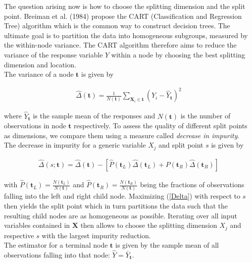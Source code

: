 {The question arising now is how to choose the splitting dimension and the split point. Breiman et al. (1984) propose the CART (Classification and Regression Tree) algorithm which is the common way to construct decision trees. The ultimate goal is to partition the data into homogeneous subgroups, measured by the within-node variance. The CART algorithm therefore aims to reduce the variance of the response variable $Y$ within a node by choosing the best splitting dimension and location. \\
The variance of a node $\mathbf{t}$ is given by

\begin{align}
    \hat{\Delta}(\mathbf{t}) = \frac{1}{N(\mathbf{t})} \sum_{\mathbf{X}_i \in \mathbf{t}} (Y_i - \hat{Y}_\mathbf{t})^2 \label{node_variance}
\end{align}

where $\hat{Y}_\mathbf{t}$ is the sample mean of the responses and $N(\mathbf{t})$ is the number of observations in node $\mathbf{t}$ respectively. To assess the quality of different split points as dimensions, we compare them using a measure called \textit{decrease in impurity}. The decrease in impurity for a generic variable $X_j$ and split point $s$ is given by

\begin{align}
    \hat{\Delta}(s; \mathbf{t}) = \hat{\Delta}(\mathbf{t}) - [\hat{P}(\mathbf{t}_L) \hat{\Delta}(\mathbf{t}_L) + \hat{P}(\mathbf{t}_R) \hat{\Delta}(\mathbf{t}_R)] \label{Delta}
\end{align}

with $\hat{P}(\mathbf{t}_L) = \frac{N(\mathbf{t}_L)}{N(\mathbf{t})}$ and $\hat{P}(\mathbf{t}_R) = \frac{N(\mathbf{t}_R)}{N(\mathbf{t})}$ being the fractions of observations falling into the left and right child node. Maximizing (\ref{Delta}) with respect to $s$ then yields the split point which in turn partitions the data such that the resulting child nodes are as homogeneous as possible. Iterating over all input variables contained in $\mathbf{X}$ then allows to choose the splitting dimension $X_j$ and respective $s$ with the largest impurity reduction. \\
The estimator for a terminal node $\mathbf{t}$ is given by the sample mean of all observations falling into that node: $\hat{Y} = \bar{Y}_{\mathbf{t}}$. \\

}
